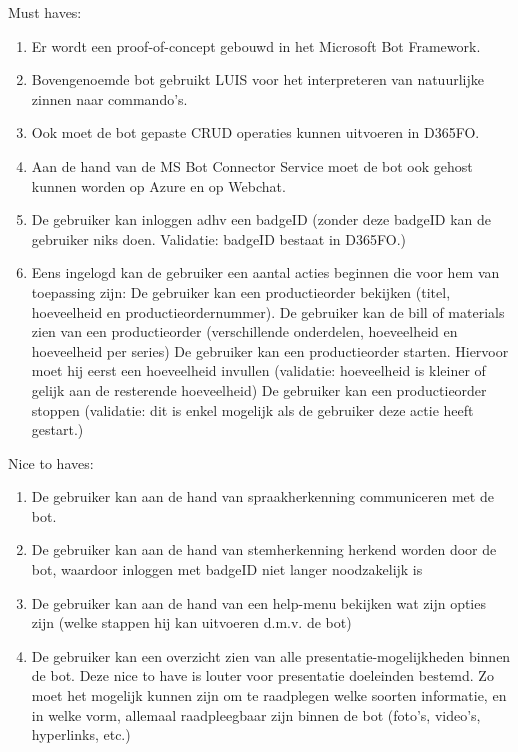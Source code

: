 Must haves:
\begin{enumerate}
    \item Er wordt een proof-of-concept gebouwd in het Microsoft Bot Framework. 
    \item Bovengenoemde bot gebruikt LUIS voor het interpreteren van natuurlijke zinnen naar commando's. 
    \item Ook moet de bot gepaste CRUD operaties kunnen uitvoeren in D365FO.
    \item Aan de hand van de MS Bot Connector Service moet de bot ook gehost kunnen worden op Azure en op Webchat. 
    \item De gebruiker kan inloggen adhv een badgeID (zonder deze badgeID kan de gebruiker niks doen. Validatie: badgeID bestaat in D365FO.)
    \item Eens ingelogd kan de gebruiker een aantal acties beginnen die voor hem van toepassing zijn:  
    \subitem De gebruiker kan een productieorder bekijken (titel, hoeveelheid en productieordernummer).
    \subitem De gebruiker kan de bill of materials zien van een productieorder (verschillende onderdelen, hoeveelheid en hoeveelheid per series)
    \subitem De gebruiker kan een productieorder starten. Hiervoor moet hij eerst een hoeveelheid invullen (validatie: hoeveelheid is kleiner of gelijk aan de resterende hoeveelheid)
    \subitem De gebruiker kan een productieorder stoppen (validatie: dit is enkel mogelijk als de gebruiker deze actie heeft gestart.) 
    
\end{enumerate}

Nice to haves:
\begin{enumerate}
    \item De gebruiker kan aan de hand van spraakherkenning communiceren met de bot.
    \item De gebruiker kan aan de hand van stemherkenning herkend worden door de bot, waardoor inloggen met badgeID niet langer noodzakelijk is
    \item De gebruiker kan aan de hand van een help-menu bekijken wat zijn opties zijn (welke stappen hij kan uitvoeren d.m.v. de bot)
    \item De gebruiker kan een overzicht zien van alle presentatie-mogelijkheden binnen de bot. Deze nice to have is louter voor presentatie doeleinden bestemd. Zo moet het mogelijk kunnen zijn om te raadplegen welke soorten informatie, en in welke vorm, allemaal raadpleegbaar zijn binnen de bot (foto's, video's, hyperlinks, etc.)
\end{enumerate}

